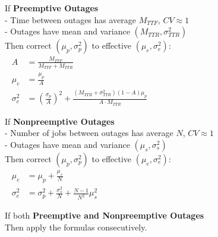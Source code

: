 \documentclass[11pt]{article}
\begin{document}


\newpage

\noindent  If \textbf{Preemptive Outages}\\
\noindent  - Time between outages has average $M_{TTF}$, $CV \approx 1$\\
\noindent  - Outages have mean and variance $(M_{TTR}, \sigma_{TTR}^2)$\\
\noindent  Then correct $(\mu_p, \sigma^2_p)$ to effective $(\mu_e, \sigma^2_e)$:
\begin{align*}
A 				&= \frac{M_{TTF}}{M_{TTF} + M_{TTR}}\\
\mu_e 			&= \frac{\mu_p}{A}\\
\sigma^2_e 	&= \left(\frac{\sigma_p}{A}\right)^2 + \frac{\left(M_{TTR} + \sigma_{TTR}^2\right)(1-A)\mu_p}{A \cdot M_{TTR}} \qquad \qquad \qquad \qquad \qquad \qquad \qquad \qquad \qquad
\end{align*}

\noindent  If \textbf{Nonpreemptive Outages}\\
\noindent  - Number of jobs between outages has average $N$, $CV \approx 1$\\
\noindent  - Outages have mean and variance $(\mu_s, \sigma_s^2)$\\
\noindent  Then correct $(\mu_p, \sigma^2_p)$ to effective $(\mu_e, \sigma^2_e)$:
\begin{align*}
\mu_e 			&= \mu_p + \frac{\mu_s}{N}\\
\sigma^2_e 	&= \sigma_p^2 + \frac{\sigma_s^2}{N} + \frac{N-1}{N^2} \mu_s^2 \qquad \qquad \qquad \qquad \qquad \qquad \qquad \qquad \qquad \qquad \qquad \qquad
\end{align*}

\noindent  If both \textbf{Preemptive and Nonpreemptive Outages}\\
\noindent  Then apply the formulas consecutively.


\end{document}
